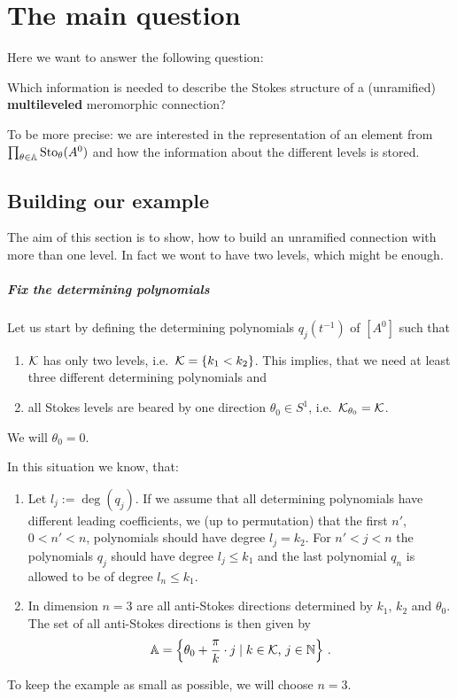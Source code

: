 \chapter{The main question}
Here we want to answer the following question:
\begin{einr}
  Which information is needed to describe the Stokes structure of a
  (unramified) \textbf{multileveled} meromorphic connection?
\end{einr}
To be more precise: we are interested in the representation of an element from
$\prod_{\theta\in\mathbb{A}}\operatorname{Sto}_\theta(A^0)$ and how the information about the
different levels is stored.

\section{Building our example}
The aim of this section is to show, how to build an unramified connection with
more than one level.
In fact we wont to have two levels, which might be enough.

\paragraph{Fix the determining polynomials}
Let us start by defining the determining polynomials $q_j(t^{-1})$ of $[A^0]$
such that
\begin{enumerate}
  \item $\mathcal{K}$ has only two levels, i.e.\  $\mathcal{K}=\{k_1<k_2\}$.
    This implies, that we need at least three different determining
    polynomials and
  \item all Stokes levels are beared by one direction $\theta_0\in S^1$,
    i.e.\ $\mathcal{K}_{\theta_0}=\mathcal{K}$.
\end{enumerate}
We will  $\theta_0=0$.
\begin{rem}
  In this situation we know, that:
  \begin{enumerate}
    \item
      Let $l_j:=\deg(q_j)$.
      If we assume that all determining polynomials have different leading
      coefficients, we  (up to permutation) that the first
      $n'$, $0<n'<n$, polynomials should have degree $l_j=k_2$.
      For $n'<j<n$ the polynomials $q_j$ should have degree $l_j\leq k_1$ and
      the last polynomial $q_n$ is allowed to be of degree $l_n\leq k_1$.
    \item In dimension $n=3$ are all anti-Stokes directions determined by
      $k_1$, $k_2$ and $\theta_0$.  The set of all anti-Stokes directions is
      then given by
      \[
        \mathbb{A}=\left\{
            \theta_0+\frac{\pi}{k}\cdot j\mid k\in\mathcal{K}\text{, } j\in\mathbb{N}
          \right\}\,.
      \]
  \end{enumerate}
\end{rem}
To keep the example as small as possible, we will choose $n=3$.

